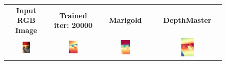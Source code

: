 \documentclass{article}
\begin{document}
\begin{figure}[H]
  \centering
  \begin{tabular}{cccc}
    \textbf{Input RGB Image} & \textbf{Trained iter: 20000} & \textbf{Marigold} & \textbf{DepthMaster} \\
    \includegraphics[width=0.2\textwidth]{images/test-image/inside-02.jpg} &
    \includegraphics[width=0.2\textwidth]{images/trained/inside-02_pred_colored.png} &
    \includegraphics[width=0.2\textwidth]{images/pretrained/inside-02_pred_colored.png} &
    \includegraphics[width=0.2\textwidth]{images/depthmaster/inside-02_pred_colored.jpg} \\


\end{tabular}
\end{figure}
\end{document}
